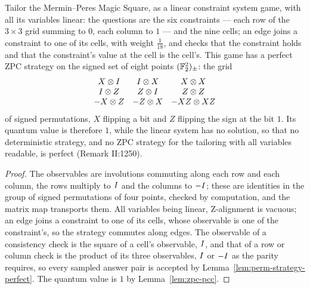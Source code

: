 \begin{proposition}
\label{prop:magic-square-zpc}
\leanok
Tailor the Mermin--Peres Magic Square, as a linear constraint system game, with all its variables
linear: the questions are the six constraints --- each row of the $3 \times 3$ grid summing to
$0$, each column to $1$ --- and the nine cells; an edge joins a constraint to one of its cells,
with weight $\frac1{18}$, and checks that the constraint holds and that the constraint's value
at the cell is the cell's. This game has a perfect ZPC strategy on the signed set of eight
points $(\mathbb{F}_2^2)_\pm$: the grid
\[
  \begin{array}{ccc}
    X \otimes I & I \otimes X & X \otimes X \\
    I \otimes Z & Z \otimes I & Z \otimes Z \\
    -X \otimes Z & -Z \otimes X & -XZ \otimes XZ
  \end{array}
\]
of signed permutations, $X$ flipping a bit and $Z$ flipping the sign at the bit $1$. Its quantum
value is therefore $1$, while the linear system has no solution, so that no deterministic
strategy, and no ZPC strategy for the tailoring with all variables readable, is perfect
(Remark II:1250).
\end{proposition}

\begin{proof}
\leanok
The observables are involutions commuting along each row and each column, the rows multiply to
$I$ and the columns to $-I$; these are identities in the group of signed permutations of
four points, checked by computation, and the matrix map transports them. All variables being
linear, Z-alignment is vacuous; an edge joins a constraint to one of its cells, whose observable
is one of the constraint's, so the strategy commutes along edges. The observable of a
consistency check is the square of a cell's observable, $I$, and that of a row or column check
is the product of its three observables, $I$ or $-I$ as the parity requires, so every
sampled answer pair is accepted by Lemma~\ref{lem:perm-strategy-perfect}. The quantum value is
$1$ by Lemma~\ref{lem:zpc-pcc}.
\end{proof}

